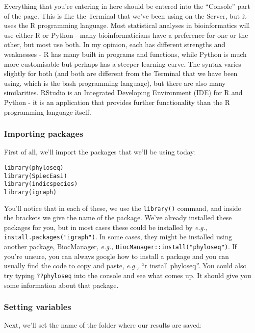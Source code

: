 \documentclass[
]{book}
\begin{document}
Everything that you're entering in here should be entered into the ``Console'' part of the page. This is like the Terminal that we've been using on the Server, but it uses the R programming language. Most statistical analyses in bioinformatics will use either R or Python - many bioinformaticians have a preference for one or the other, but most use both. In my opinion, each has different strengths and weaknesses - R has many built in programs and functions, while Python is much more customisable but perhaps has a steeper learning curve. The syntax varies slightly for both (and both are different from the Terminal that we have been using, which is the bash programming language), but there are also many similarities. RStudio is an Integrated Developing Environment (IDE) for R and Python - it is an application that provides further functionality than the R programming language itself.

\subsubsection{Importing packages}\label{importing-packages-1}

First of all, we'll import the packages that we'll be using today:

\begin{verbatim}
library(phyloseq)
library(SpiecEasi)
library(indicspecies)
library(igraph)
\end{verbatim}

You'll notice that in each of these, we use the \texttt{library()} command, and inside the brackets we give the name of the package. We've already installed these packages for you, but in most cases these could be installed by \emph{e.g.,} \texttt{install.packages("igraph")}. In some cases, they might be installed using another package, BiocManager, \emph{e.g.,} \texttt{BiocManager::install("phyloseq")}. If you're unsure, you can always google how to install a package and you can usually find the code to copy and paste, \emph{e.g.,} ``r install phyloseq''. You could also try typing \texttt{??phyloseq} into the console and see what comes up. It should give you some information about that package.

\subsubsection{Setting variables}\label{setting-variables-1}

Next, we'll set the name of the folder where our results are saved:
\end{document}
